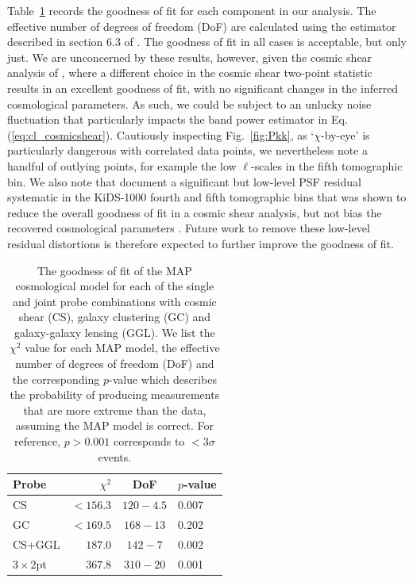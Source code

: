 Table~\ref{tab:goodness-of-fit} records the goodness of fit for each component in our \tttp analysis.  The effective number of degrees of freedom (DoF) are calculated using the estimator described in section 6.3 of \citet{joachimi/etal:inprep}.   The goodness of fit in all cases is acceptable, but only just.  
We are unconcerned by these results, however, given the cosmic shear analysis of \citet{asgari/etal:inprep}, where a different choice in the cosmic shear two-point statistic results in an excellent goodness of fit, with no significant changes in the inferred cosmological parameters.    As such, we could be subject to an unlucky noise fluctuation that particularly impacts the band power estimator in Eq. (\ref{eq:cl_cosmicshear}).  Cautiously inspecting Fig.~\ref{fig:Pkk}, as `$\chi$-by-eye' is particularly dangerous with correlated data points, we nevertheless note a handful of outlying points, for example the low $\ell$-scales in the fifth tomographic bin.   We also note that \citet{giblin/etal:inprep} document a significant but low-level PSF residual systematic in the KiDS-1000 fourth and fifth tomographic bins that was shown to reduce the overall goodness of fit in a cosmic shear analysis, but not bias the recovered cosmological parameters \citep[see also the discussion in][]{amara/refregier:2008}.  Future work to remove these low-level residual distortions is therefore expected to further improve the goodness of fit.

\begin{table}
	\begin{center}
		\caption{The goodness of fit of the MAP cosmological model for each of the single and joint probe combinations with cosmic shear (CS), galaxy clustering (GC) and galaxy-galaxy lensing (GGL).   We list the $\chi^2$ value for each MAP model, the effective number of degrees of freedom (DoF) and the corresponding $p$-value which describes the probability of producing measurements that are more extreme than the data, assuming the MAP model is correct.   For reference, $p > 0.001$ corresponds to $<3\sigma$ events.}
		\label{tab:goodness-of-fit}
\begin{tabular}{lrcl}
    \toprule
    Probe             & $\chi^2$       & DoF       & $p$-value   \\
    \midrule
	CS               & $< 156.3$ & $120-4.5$ & 0.007 \\
	GC               & $< 169.5$ & $168-13$ & 0.202 \\
	CS+GGL           & $187.0$ & $142-7$ & 0.002 \\
	$3\times2$pt            & $367.8$ & $310-20$ & 0.001 \\

    \bottomrule
\end{tabular}
	\end{center}
\end{table}

